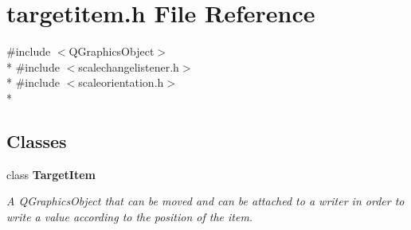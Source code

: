 \section{targetitem.\+h File Reference}
\label{bk3_2items_2targetitem_8h}
{\ttfamily \#include $<$Q\+Graphics\+Object$>$}\\*
{\ttfamily \#include $<$scalechangelistener.\+h$>$}\\*
{\ttfamily \#include $<$scaleorientation.\+h$>$}\\*
\subsection*{Classes}
\begin{DoxyCompactItemize}
\item 
class {\bf Target\+Item}
\begin{DoxyCompactList}\small\item\em A Q\+Graphics\+Object that can be moved and can be attached to a writer in order to write a value according to the position of the item. \end{DoxyCompactList}\end{DoxyCompactItemize}
